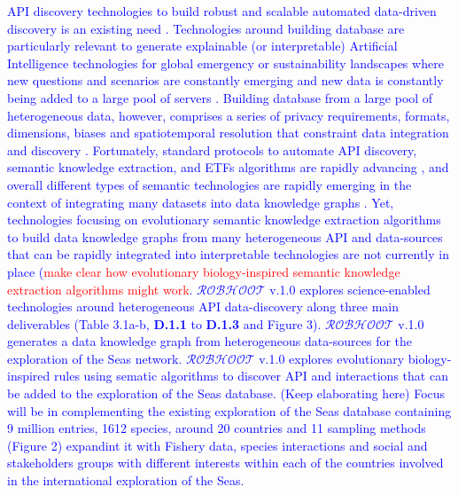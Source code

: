 \documentclass[11pt, a4paper]{article} %
\begin{document}
{\textcolor{blue}{API discovery technologies to build robust and
  scalable automated data-driven discovery is an existing need
  \citep{Fan2012,Staar2018}. Technologies around building database are
  particularly relevant to generate explainable (or interpretable)
  Artificial Intelligence technologies for global emergency or
  sustainability landscapes where new questions and scenarios are
  constantly emerging and new data is constantly being added to a
  large pool of servers \citep{Futia2020}. Building database from a
  large pool of heterogeneous data, however, comprises a series of
  privacy requirements, formats, dimensions, biases and spatiotemporal
  resolution that constraint data integration and discovery
  \citep{Openstreetmap,Bluecloud,HOT,Elixir}. Fortunately, standard
  protocols to automate API discovery, semantic knowledge extraction,
  and ETFs algorithms are rapidly advancing
  \citep{Fan2012,APISGURU,OpenKnowledgeFoundation}, and overall
  different types of semantic technologies are rapidly emerging in the
  context of integrating many datasets into data knowledge graphs
  \citep{KGcovid19}. Yet, technologies focusing on evolutionary
  semantic knowledge extraction algorithms to build data knowledge
  graphs from many heterogeneous API and data-sources that can be
  rapidly integrated into interpretable technologies are not currently
  in place \citep{Futia2020} (\textcolor{red}{make clear how
    evolutionary biology-inspired semantic knowledge extraction
    algorithms might work}. $\mathcal{ROBHOOT}$ v.1.0 explores
  science-enabled technologies around heterogeneous API data-discovery
  along three main deliverables (Table 3.1a-b, {\bf D.1.1} to {\bf
    D.1.3} and Figure 3). $\mathcal{ROBHOOT}$ v.1.0 generates a data
  knowledge graph from heterogeneous data-sources for the exploration
  of the Seas network. $\mathcal{ROBHOOT}$ v.1.0 explores evolutionary
  biology-inspired rules using sematic algorithms to discover API and
  interactions that can be added to the exploration of the Seas
  database. (Keep elaborating here) Focus will be in complementing the
  existing exploration of the Seas database containing 9 million
  entries, 1612 species, around 20 countries and 11 sampling methods
  (Figure 2) expandint it with Fishery data, species interactions and
  social and stakeholders groups with different interests within each
  of the countries involved in the international exploration of the
  Seas.}


}
\end{document}
